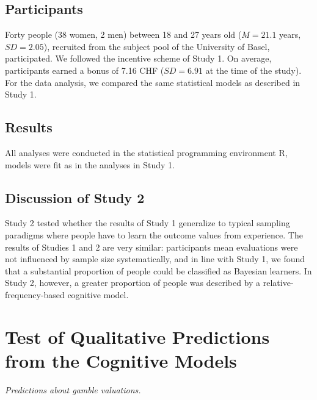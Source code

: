 \documentclass[a4paper, man, natbib, floatsintext]{apa6}
\begin{document}
\subsection{Participants}
Forty people (38 women, 2 men) between 18 and 27 years old ($M = 21.1$ years, $SD = 2.05$), recruited from the subject pool of the University of Basel, participated. We followed the incentive scheme of Study 1. On average, participants earned a bonus of 7.16 CHF ($SD = 6.91$ at the time of the study). For the data analysis, we compared the same statistical models as described in Study 1.

\subsection{Results}
All analyses were conducted in the statistical programming environment R, models were fit as in the analyses in Study 1.


\clearpage

\subsection{Discussion of Study 2}
Study 2 tested whether the results of Study 1  generalize to typical sampling paradigms where people have to learn the outcome values from experience. The results of Studies 1 and 2 are very similar: participants mean evaluations were not influenced by sample size systematically, and in line with Study 1, we found that a substantial proportion of people could be classified as Bayesian learners. In Study 2, however, a greater proportion of people was described by a  relative-frequency-based cognitive model.

\clearpage %

\section{Test of Qualitative Predictions from the Cognitive Models}

\textit{Predictions about gamble valuations.}
\end{document}
